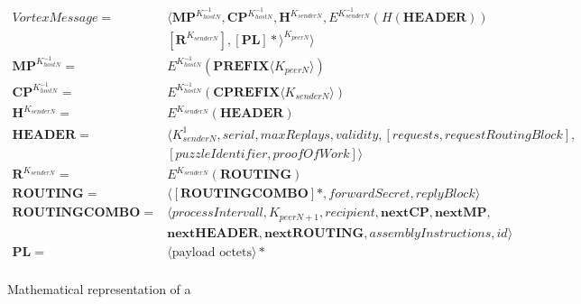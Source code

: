   
  \begin{figure}[!ht]
  	\begin{align}
  		VortexMessage                = &\langle \mathbf{MP}^{K^{-1}_{hostN}}, \mathbf{CP}^{K^{-1}_{hostN}}, \mathbf{H}^{K_{senderN}}, E^{K^{-1}_{senderN}}\left(H\left(\mathbf{HEADER}\right)\right)  \nonumber \\
  		& \left[\mathbf{R}^{K_{senderN}}\right], \left[\mathbf{PL}\right]*\rangle^{K_{peerN}} \rangle\label{eq:vortexMessage}\\ 
  		\mathbf{MP}^{K^{-1}_{hostN}} = &E^{K^{-1}_{hostN}}\left(\mathbf{PREFIX}\langle K_{peerN}\rangle \right)\\ 
  		\mathbf{CP}^{K^{-1}_{hostN}} = &E^{K^{-1}_{hostN}}\left(\mathbf{CPREFIX}\langle K_{senderN}\rangle \right)\\ 
  		\mathbf{H}^{K_{senderN}}     = &E^{K_{senderN}}\left(\mathbf{HEADER}\right)\\  
  		\mathbf{HEADER}              = &\langle K^{1}_{senderN}, serial, maxReplays, validity, [requests, requestRoutingBlock],\nonumber\\ 
  		& [puzzleIdentifier, proofOfWork] \rangle \\  
  		\mathbf{R}^{K_{senderN}}     = & E^{K_{senderN}}\left(\mathbf{ROUTING}\right)\\ 
  		\mathbf{ROUTING}             = & \langle [ \mathbf{ROUTINGCOMBO} ] *, forwardSecret, replyBlock \rangle\\  
  		\mathbf{ROUTINGCOMBO}        = & \langle processIntervall, K_{peerN+1}, recipient, \mathbf{nextCP}, \mathbf{nextMP}, \nonumber \\
  		& \mathbf{nextHEADER}, \mathbf{nextROUTING}, assemblyInstructions, id \rangle\\
  		\mathbf{PL}                  = &\langle \text{payload octets} \rangle *\\ 
  	\end{align}
  	\caption{Mathematical representation of a \VortexMessage}
  \end{figure}
  

  
  
  
  
  
  

